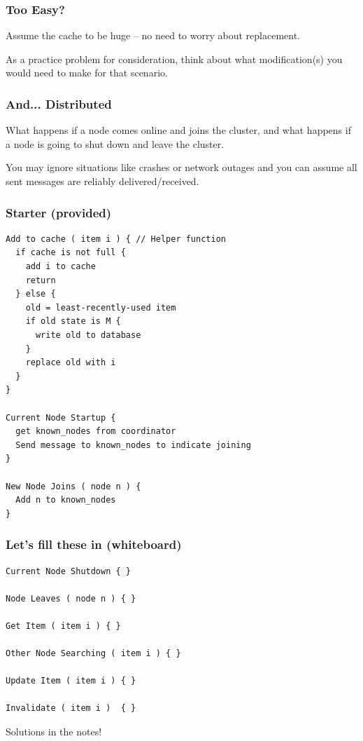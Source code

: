 \begin{frame}
\frametitle{Too Easy?}

Assume the cache to be huge -- no need to worry about replacement.

As a practice problem for consideration, think about what modification(s) you would need to make for that scenario.

\end{frame}

\begin{frame}
\frametitle{And... Distributed}

What happens if a node comes online and joins the cluster, and what happens if a node is going to shut down and leave the cluster. 


You may ignore situations like crashes or network outages and you can assume all sent messages are reliably delivered/received.


\end{frame}

\begin{frame}[fragile]
\frametitle{Starter (provided)}

\begin{lstlisting}[basicstyle=\footnotesize\ttfamily]
Add to cache ( item i ) { // Helper function
  if cache is not full {
    add i to cache
    return
  } else {
    old = least-recently-used item
    if old state is M {
      write old to database
    }
    replace old with i
  }
}

Current Node Startup {
  get known_nodes from coordinator
  Send message to known_nodes to indicate joining
}

New Node Joins ( node n ) {
  Add n to known_nodes
}

\end{lstlisting}
\end{frame}

\begin{frame}[fragile]
\frametitle{Let's fill these in (whiteboard)}

\begin{lstlisting}[basicstyle=\footnotesize\ttfamily]
Current Node Shutdown { }

Node Leaves ( node n ) { }

Get Item ( item i ) { }

Other Node Searching ( item i ) { }

Update Item ( item i ) { }

Invalidate ( item i )  { }
\end{lstlisting}
Solutions in the notes! 

\end{frame}


